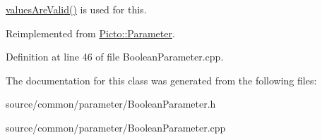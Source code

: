 \hyperlink{class_picto_1_1_parameter_a3443808da4c3edf26f2c3c3772d95b10}{values\-Are\-Valid()} is used for this. 

Reimplemented from \hyperlink{class_picto_1_1_parameter_a94c0e4191ffcc0bd642b647d24557082}{Picto\-::\-Parameter}.



Definition at line 46 of file Boolean\-Parameter.\-cpp.



The documentation for this class was generated from the following files\-:\begin{DoxyCompactItemize}
\item 
source/common/parameter/Boolean\-Parameter.\-h\item 
source/common/parameter/Boolean\-Parameter.\-cpp\end{DoxyCompactItemize}
